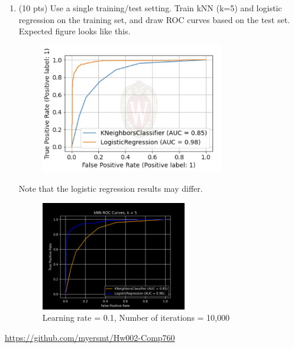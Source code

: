 \documentclass[a4paper]{article}
\theoremstyle{definition}
\newcommand{\red}[1]{\textcolor{red}{#1}}
\newenvironment{soln}{
    \leavevmode\color{blue}\ignorespaces
}{}
\begin{document}
\begin{enumerate}
	\item (10 pts) Use a single training/test setting. Train kNN (k=5) and logistic regression on the training set, and draw ROC curves based on the test set. \\
	Expected figure looks like this.
	\begin{figure}[h]
		\centering
		\includegraphics[width=8cm]{needed/roc.png}
	\end{figure}
	Note that the logistic regression results may differ.
	
	\begin{soln}
            \begin{figure}[H]
                \centering
                \includegraphics[width=0.6\textwidth]{figs/q2/p5/kNN_ROC_Curves.png} 
                \captionsetup{labelformat=empty}
                \caption{Learning rate = 0.1, Number of iterations = 10,000}
                \label{fig:my_label}
             \end{figure}
        \end{soln}
	
\end{enumerate}

\newpage
\red{\url{https://github.com/myersmt/Hw002-Comp760}}
\end{document}
